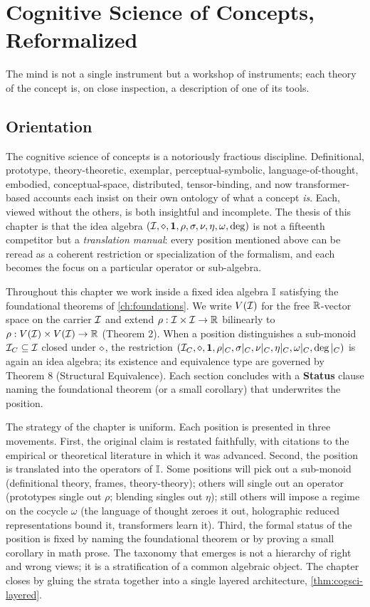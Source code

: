 \chapter{Cognitive Science of Concepts, Reformalized}\label{ch:cogsci}

\epigraph{The mind is not a single instrument but a workshop of instruments;
each theory of the concept is, on close inspection, a description of one of
its tools.}{}

\section*{Orientation}

The cognitive science of concepts is a notoriously fractious discipline.
Definitional, prototype, theory-theoretic, exemplar, perceptual-symbolic,
language-of-thought, embodied, conceptual-space, distributed,
tensor-binding, and now transformer-based accounts each insist on their own
ontology of what a concept \emph{is}. Each, viewed without the others, is
both insightful and incomplete. The thesis of this chapter is that the idea
algebra $(\mathcal{I},\mathbin{\diamond},\mathbf{1},\rho,\sigma,\nu,\eta,\omega,\deg)$ is not a
fifteenth competitor but a \emph{translation manual}: every position
mentioned above can be reread as a coherent restriction or specialization of
the formalism, and each becomes the focus on a particular operator or
sub-algebra.

Throughout this chapter we work inside a fixed idea algebra $\mathbb{I}$
satisfying the foundational theorems of \cref{ch:foundations}. We write
$V(\mathcal{I})$ for the free $\mathbb{R}$-vector space on the carrier $\mathcal{I}$ and
extend $\rho:\mathcal{I}\times\mathcal{I}\to\mathbb{R}$ bilinearly to
$\rho:V(\mathcal{I})\times V(\mathcal{I})\to\mathbb{R}$ (Theorem 2). When a position
distinguishes a sub-monoid $\mathcal{I}_C\subseteq\mathcal{I}$ closed under
$\mathbin{\diamond}$, the restriction
$(\mathcal{I}_C,\mathbin{\diamond},\mathbf{1},\rho|_C,\sigma|_C,\nu|_C,\eta|_C,\omega|_C,\deg|_C)$
is again an idea algebra; its existence and equivalence type are governed
by Theorem 8 (Structural Equivalence). Each section concludes with a
\textbf{Status} clause naming the foundational theorem (or a small
corollary) that underwrites the position.

The strategy of the chapter is uniform. Each position is presented in three
movements. First, the original claim is restated faithfully, with citations
to the empirical or theoretical literature in which it was advanced. Second,
the position is translated into the operators of $\mathbb{I}$. Some positions
will pick out a sub-monoid (definitional theory, frames, theory-theory);
others will single out an operator (prototypes single out $\rho$; blending
singles out $\eta$); still others will impose a regime on the cocycle
$\omega$ (the language of thought zeroes it out, holographic reduced
representations bound it, transformers learn it). Third, the formal
status of the position is fixed by naming the foundational theorem or by
proving a small corollary in math prose. The taxonomy that emerges is not a
hierarchy of right and wrong views; it is a stratification of a common
algebraic object. The chapter closes by gluing the strata together into a
single layered architecture, \cref{thm:cogsci-layered}.

